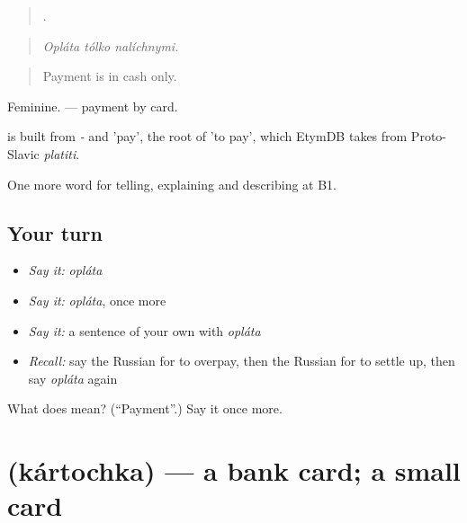 \begin{quote}
  .
\end{quote}

\begin{quote}
\emph{Opláta tólko nalíchnymi.}
\end{quote}

\begin{quote}
Payment is in cash only.
\end{quote}

Feminine. \emph{ } — payment by card.

\begin{cousinweb}
\emph{} is built from \emph{-} and \emph{} 'pay', the root of \emph{} 'to pay', which EtymDB takes from Proto-Slavic \emph{platiti}.
\end{cousinweb}

\begin{grammarlens}[title={What you've built}]
One more word for telling, explaining and describing at B1.
\end{grammarlens}

\subsection*{Your turn}
\begin{itemize}
\raggedright
  \item \emph{Say it:} \emph{opláta}
  \item \emph{Say it:} \emph{opláta}, once more
  \item \emph{Say it:} a sentence of your own with \emph{opláta}
  \item \emph{Recall:} say the Russian for to overpay, then the Russian for to settle up, then say \emph{opláta} again
\end{itemize}

\begin{tcolorbox}[breakable,colback=teal!4,colframe=teal!35!black,title={Before you move on}]
What does  mean? (\textquotedblleft{}Payment\textquotedblright{}.) Say it once more.
\end{tcolorbox}
\section[\texorpdfstring{\ru{карточка} (kártochka)}{карточка (kártochka)}]{ (kártochka) — a bank card; a small card}

